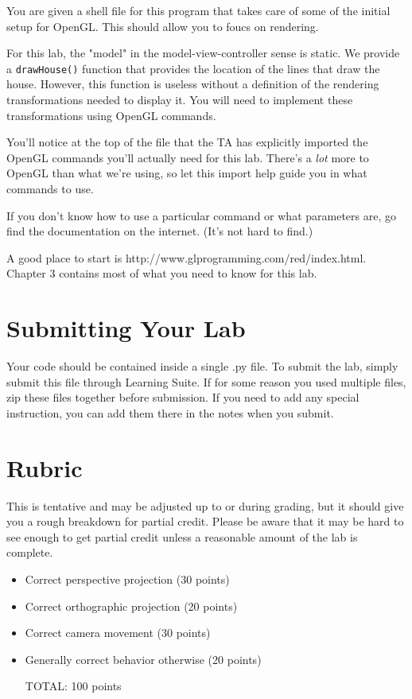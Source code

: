 \documentclass[11pt]{article}
\begin{document}
You are given a shell file for this program that takes care of some of the initial setup for OpenGL. This should allow you to foucs on rendering. 

For this lab, the "model" in the model-view-controller sense is static. We provide a {\tt drawHouse()} function that provides the location of the lines that draw the house. However, this function is useless without a definition of the rendering transformations needed to display it. You will need to implement these transformations using OpenGL commands.

You'll notice at the top of the file that the TA has explicitly imported the OpenGL commands you'll actually need for this lab. There's a \textit{lot} more to OpenGL than what we're using, so let this import help guide you in what commands to use.

If you don't know how to use a particular command or what parameters are, go find the documentation on the internet. (It's not hard to find.)

A good place to start is http://www.glprogramming.com/red/index.html. Chapter 3 contains most of what you need to know for this lab.

\section*{Submitting Your Lab}

Your code should be contained inside a single .py file. To submit the lab, simply submit this file through Learning Suite. If for some reason you used multiple files, zip these files together before submission. If you need to add any special instruction, you can add them there in the notes when you submit.

\divider

\section*{Rubric}

This is tentative and may be adjusted up to or during grading, but it should give you a rough breakdown for partial credit. Please be aware that it may be hard to see enough to get partial credit unless a reasonable amount of the lab is complete.

\begin{itemize}
	\item	Correct perspective projection (30 points)
    \item   Correct orthographic projection (20 points)
    \item   Correct camera movement (30 points)
    \item   Generally correct behavior otherwise (20 points)
	
TOTAL: 100 points

\end{itemize}
\end{document}
